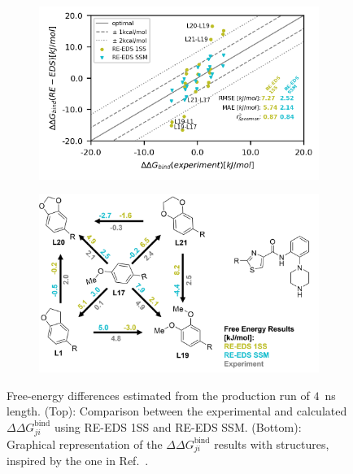 \begin{figure}[h]
	\centering
	\begin{subfigure}{0.85\columnwidth}
		\includegraphics[width=\textwidth]{fig/results/ringOpening/FE/RingClosure_system_final_results_4ns.png}
	\end{subfigure}
	\begin{subfigure}{0.85\columnwidth}
		\includegraphics[width=\textwidth]{fig/results/ringOpening/FE/ddG_bind_paper_comparison_reeds_only_4nsSimulation.png}
	\end{subfigure}
	\caption{Free-energy differences estimated from the production run of $4$~ns length. (Top): Comparison between the experimental and calculated $\Delta \Delta G^\text{bind}_{ji}$ using RE-EDS 1SS and RE-EDS SSM. (Bottom): Graphical representation of the $\Delta \Delta G^\text{bind}_{ji}$ results with structures, inspired by the one in Ref.~\cite{Wang2017}.}
	\label{fig:CHK1_set2_FreeEnergyCalculation}
\end{figure}


